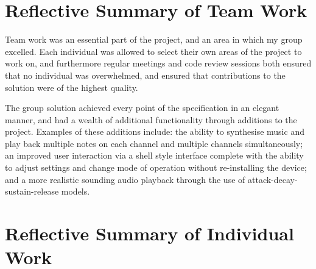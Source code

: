 \section{Reflective Summary of Team Work}

Team work was an essential part of the project, and an area in which my group 
excelled. Each individual was allowed to select their own areas of the project 
to work on, and furthermore regular meetings and code review sessions both ensured 
that no individual was overwhelmed, and ensured that contributions to the 
solution were of the highest quality. 
\par\bigskip\noindent
The group solution achieved every point of the specification in an elegant 
manner, and had a wealth of additional functionality through additions to the 
project. 
Examples of these additions include: the ability to synthesise music and 
play back multiple notes on each channel and multiple channels simultaneously; 
an improved user interaction via a shell style interface complete with the 
ability to adjust settings and change mode of operation without re-installing the 
device; and a more realistic sounding audio playback through the use of 
attack-decay-sustain-release models. 

\section{Reflective Summary of Individual Work}


